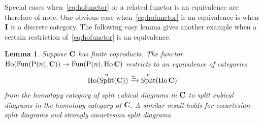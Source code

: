 \documentclass[psamsfonts]{amsart}
\theoremstyle{plain}
\newtheorem{lem}[thm]{Lemma}
\theoremstyle{definition}
\theoremstyle{remark}
\newcommand{\catname}[1]{{\normalfont\textbf{#1}}}
\newcommand{\power}{\mathrm{P}}
\DeclareMathOperator{\fun}{Fun}
\DeclareMathOperator{\splitcube}{Split}
\DeclareMathOperator{\ho}{Ho}
\begin{document}
Special cases when~\eqref{eq:hofunctor} or a related functor is an equivalence are therefore of note. One obvious case when~\eqref{eq:hofunctor} is an equivalence is when $\catname{I}$ is a discrete category. The following easy lemma gives another example when a certain restriction of~\eqref{eq:hofunctor} is an equivalence.
\begin{lem}\label{lemma: homotopy split}
Suppose $\catname{C}$ has finite coproducts. The functor $\ho(\fun(\power(n), \catname{C}))\to \fun(\power(n), \ho\catname{C})$ restricts to an equivalence of categories
\[
\ho(\splitcube^n(\catname{C}))\xrightarrow{\simeq} \splitcube^n(\ho\catname{C})
\]
from the homotopy category of split cubical diagrams in $\catname{C}$ to split cubical diagrams in the homotopy category of $\catname{C}$. A similar result holds for cocartesian split diagrams and strongly cocartesian split diagrams.
\end{lem}
\end{document}
